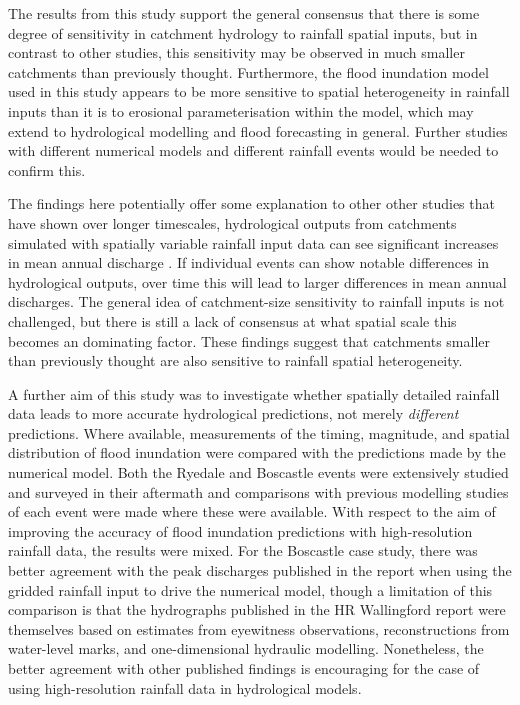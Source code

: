 The results from this study support the general consensus that there is some degree of sensitivity in catchment hydrology to rainfall spatial inputs, but in contrast to other studies, this sensitivity may be observed in much smaller catchments than previously thought. Furthermore, the flood inundation model used in this study appears to be more sensitive to spatial heterogeneity in rainfall inputs than it is to erosional parameterisation within the model, which may extend to hydrological modelling and flood forecasting in general. Further studies with different numerical models and different rainfall events would be needed to confirm this. 

The findings here potentially offer some explanation to other other studies that have shown over longer timescales, hydrological outputs from catchments simulated with spatially variable rainfall input data can see significant increases in mean annual discharge \citep{coulthard2016sensitivity}. If individual events can show notable differences in hydrological outputs, over time this will lead to larger differences in mean annual discharges. The general idea of catchment-size sensitivity to rainfall inputs is not challenged, but there is still a lack of consensus at what spatial scale this becomes an dominating factor. These findings suggest that catchments smaller than previously thought are also sensitive to rainfall spatial heterogeneity.

A further aim of this study was to investigate whether spatially detailed rainfall data leads to more accurate hydrological predictions, not merely \textit{different} predictions. Where available, measurements of the timing, magnitude, and spatial distribution of flood inundation were compared with the predictions made by the numerical model. Both the Ryedale and Boscastle events were extensively studied and surveyed in their aftermath and comparisons with previous modelling studies of each event were made where these were available. With respect to the aim of improving the accuracy of flood inundation predictions with high-resolution rainfall data, the results were mixed. For the Boscastle case study, there was better agreement with the peak discharges published in the \citet{wallingford2005flooding} report when using the gridded rainfall input to drive the numerical model, though a limitation of this comparison is that the hydrographs published in the HR Wallingford report were themselves based on estimates from eyewitness observations, reconstructions from water-level marks, and one-dimensional hydraulic modelling. Nonetheless, the better agreement with other published findings is encouraging for the case of using high-resolution rainfall data in hydrological models.


